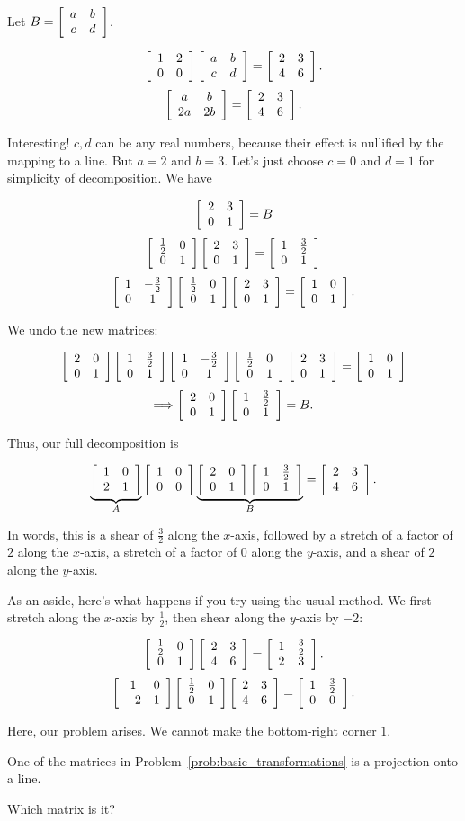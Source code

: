 \documentclass[../key.tex]{subfiles}
\begin{document}
Let $B=\twomat{a}{b}{c}{d}$.

$$\twomat{1}{2}{0}{0}\twomat{a}{b}{c}{d}=\twomat{2}{3}{4}{6}.$$
$$\twomat{a}{b}{2a}{2b}=\twomat{2}{3}{4}{6}.$$

Interesting! $c,d$ can be any real numbers, because their effect is nullified by the mapping to a line. But $a=2$ and $b=3$. Let's just choose $c=0$ and $d=1$ for simplicity of decomposition. We have

$$\twomat{2}{3}{0}{1}=B$$
$$\twomat{\frac{1}{2}}{0}{0}{1}\twomat{2}{3}{0}{1}=\twomat{1}{\frac{3}{2}}{0}{1}$$
$$\twomat{1}{-\frac{3}{2}}{0}{1}\twomat{\frac{1}{2}}{0}{0}{1}\twomat{2}{3}{0}{1}=\twomat{1}{0}{0}{1}.$$

We undo the new matrices:

$$\twomat{2}{0}{0}{1}\twomat{1}{\frac{3}{2}}{0}{1}\twomat{1}{-\frac{3}{2}}{0}{1}\twomat{\frac{1}{2}}{0}{0}{1}\twomat{2}{3}{0}{1}=\twomat{1}{0}{0}{1}$$
$$\Longrightarrow \twomat{2}{0}{0}{1}\twomat{1}{\frac{3}{2}}{0}{1} = B.$$

Thus, our full decomposition is

$$\underbrace{\twomat{1}{0}{2}{1}}_{A}\twomat{1}{0}{0}{0}\underbrace{\twomat{2}{0}{0}{1}\twomat{1}{\frac{3}{2}}{0}{1}}_{B}=\twomat{2}{3}{4}{6}.$$

In words, this is a shear of $\frac{3}{2}$ along the $x$-axis, followed by a stretch of a factor of $2$ along the $x$-axis, a stretch of a factor of $0$ along the $y$-axis, and a shear of $2$ along the $y$-axis.

As an aside, here's what happens if you try using the usual method. We first stretch along the $x$-axis by $\frac{1}{2}$, then shear along the $y$-axis by $-2$:

$$\twomat{\frac{1}{2}}{0}{0}{1}\twomat{2}{3}{4}{6} = \twomat{1}{\frac{3}{2}}{2}{3}.$$
$$\twomat{1}{0}{-2}{1}\twomat{\frac{1}{2}}{0}{0}{1}\twomat{2}{3}{4}{6} = \twomat{1}{\frac{3}{2}}{0}{0}.$$

Here, our problem arises. We cannot make the bottom-right corner $1$.

\begin{outer_problem}
\item One of the matrices in Problem~\ref{prob:basic_transformations} is a projection onto a line.
\end{outer_problem}

\begin{inner_problem}[start=1]
\item Which matrix is it?
\end{inner_problem}
\end{document}
